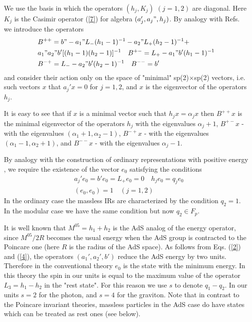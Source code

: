 \documentclass[a4paper,12pt]{article}%
\begin{document}
We use the basis in which the operators 
$(h_j,K_j)$ $(j=1,2)$ are diagonal. Here $K_j$ is the 
Casimir operator (\ref{7}) for algebra $(a_j',a_j",h_j)$. 
By analogy with Refs. \cite{Evans,Braden} we introduce the
operators 
\begin{eqnarray}
&B^{++}=b"-a_1"L_-(h_1-1)^{-1}-a_2"L_+(h_2-1)^{-1}+\nonumber\\
&a_1"a_2"b'[(h_1-1)(h_2-1)]^{-1}\quad 
B^{+-}=L_+-a_1"b'(h_1-1)^{-1}\nonumber\\
&B^{-+}=L_--a_2"b'(h_2-1)^{-1}\quad B^{--}=b'
\label{12}
\end{eqnarray}
and consider their action only on the space of "minimal" 
sp(2)$\times$sp(2) vectors, i.e. such vectors $x$ that 
$a_j'x=0$ for $j=1,2$, and $x$ is the eigenvector of the
operators $h_j$. 

It is easy to see that if $x$ is a minimal vector such that
$h_jx=\alpha_jx$ then $B^{++}x$ is the minimal eigenvector of the
operators $h_j$ with the eigenvalues $\alpha_j+1$, $B^{+-}x$ - 
with the eigenvalues $(\alpha_1+1,\alpha_2-1)$, 
$B^{-+}x$ - with the eigenvalues $(\alpha_1-1,\alpha_2+1)$, 
and $B^{--}x$ - with the eigenvalues $\alpha_j-1$.

By analogy with the construction of ordinary representations with
positive energy \cite{Fronsdal,Evans}, we require the existence
of the vector $e_0$ satisfying the conditions
\begin{eqnarray}
&a_j'e_0=b'e_0=L_+e_0=0\quad h_je_0=q_je_0\nonumber\\
&(e_0,e_0)=1\quad (j=1,2)
\label{13}
\end{eqnarray}
In the ordinary case the massless IRs are characterized by
the condition $q_2=1$. In the modular case we have the
same condition but now $q_2\in F_p$.

It is well known that $M^{05}=h_1+h_2$ is the AdS analog of 
the energy operator, since $M^{05}/2R$ becomes the usual 
energy when the AdS group is contracted to the Poincare one 
(here $R$ is the radius of the AdS space). As follows from 
Eqs. (\ref{2}) and (\ref{4}), the operators $(a_1',a_2',b')$ 
reduce the AdS energy by two units. Therefore in the 
conventional theory
$e_0$ is the state with the minimum energy. In this theory 
the spin in our units is equal to the maximum value of the 
operator $L_3=h_1-h_2$ in the
"rest state". For this reason we use $s$ to denote $q_1-q_2$.
In our units $s=2$ for the photon, and $s=4$ for the graviton.
Note that in contrast to the Poincare invariant theories, 
massless particles in the AdS case do have states which can be
treated as rest ones (see below).
\end{document}
